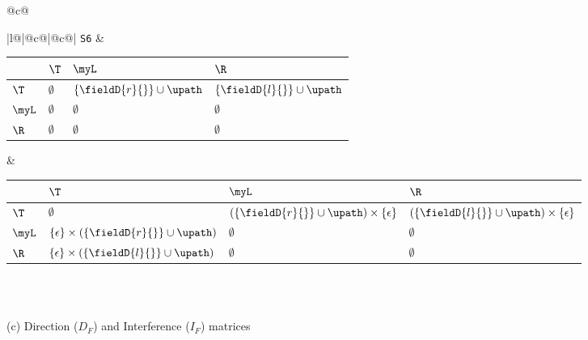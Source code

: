 \begin{figure}
{\begin{tabular}{@{}c@{}}
{\begin{tabular}[b]{|l@{}|@{}c@{}|@{}c@{}|}
{\tt S6} & 
\begin{tabular}{|p{3mm}|p{22mm}p{22mm}p{22mm}|} \hline
            & $\T$  		& $\myL$ 		& $\R$ 	 \\ \hline
  $\T$ 		& $\emptyset$	& $\{\fieldD{r}{}\} \cup \upath$	& $\{\fieldD{l}{}\} \cup \upath$ \\ \hline
  $\myL$ 	& $\emptyset$	& $\emptyset$	& $\emptyset$	\\ \hline
  $\R$ 		& $\emptyset$	& $\emptyset$	& $\emptyset$	\\ \hline
\end{tabular}
 &
\begin{tabular}{|p{3mm}|p{35mm}p{35mm}p{35mm}|} \hline
            & $\T$  		& $\myL$ 		& $\R$ 	 \\ \hline
  $\T$ 		& $\emptyset$	& $(\{\fieldD{r}{}\} \cup \upath) \times \{\epsilon\}$	& $(\{\fieldD{l}{}\} \cup \upath) \times \{\epsilon\}$ \\ \hline
  $\myL$ 	& $\{\epsilon\} \times (\{\fieldD{r}{}\} \cup \upath)$	& $\emptyset$	& $\emptyset$	\\ \hline
  $\R$ 		& $\{\epsilon\} \times (\{\fieldD{l}{}\} \cup \upath)$	& $\emptyset$	& $\emptyset$	\\ \hline
\end{tabular} \\ \hline
\end{tabular} 
}  \\
  \footnotesize (c) Direction ($D_F$) and Interference ($I_F$) matrices  \\ \\
\end{tabular}}
\end{figure}

